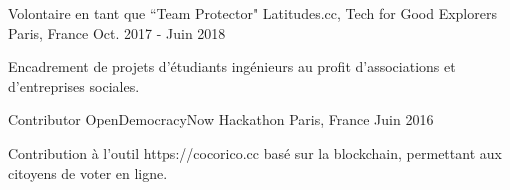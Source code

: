 \begin{cventries}
  \cventry
    {Volontaire en tant que ``Team Protector"}
    {Latitudes.cc, Tech for Good Explorers}
    {Paris, France}
    {Oct. 2017 - Juin 2018}
    {
      \begin{cvitems}
        \item {Encadrement de projets d'étudiants ingénieurs au profit d'associations et d'entreprises sociales.}
      \end{cvitems}
    }
  \cventry
    {Contributor}
    {OpenDemocracyNow Hackathon}
    {Paris, France}
    {Juin 2016}
    {
      \begin{cvitems}
        \item {Contribution à l'outil https://cocorico.cc basé sur la blockchain, permettant aux citoyens de voter en ligne.}
      \end{cvitems}
    }
\end{cventries}
